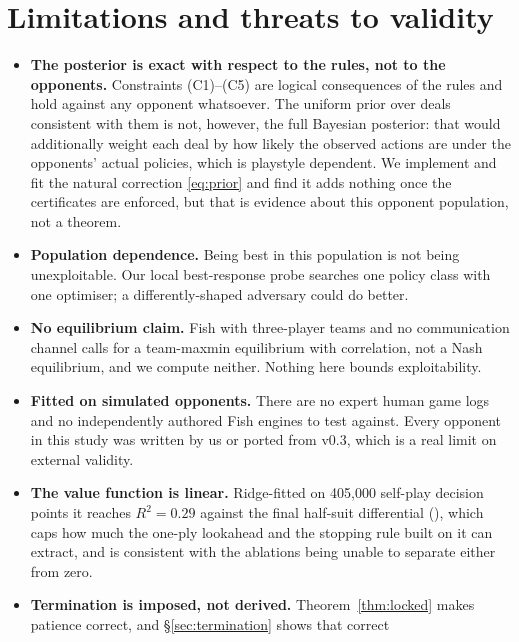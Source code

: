 \section{Limitations and threats to validity}
\label{sec:limitations}

\begin{itemize}
  \item \textbf{The posterior is exact with respect to the rules, not to the
        opponents.} Constraints (C1)--(C5) are logical consequences of the
        rules and hold against any opponent whatsoever. The uniform prior over
        deals consistent with them is not, however, the full Bayesian posterior:
        that would additionally weight each deal by how likely the observed
        actions are under the opponents' actual policies, which is playstyle
        dependent. We implement and fit the natural correction \eqref{eq:prior}
        and find it adds nothing once the certificates are enforced, but that is
        evidence about this opponent population, not a theorem.
  \item \textbf{Population dependence.} Being best in this population is not
        being unexploitable. Our local best-response probe searches one policy
        class with one optimiser; a differently-shaped adversary could do better.
  \item \textbf{No equilibrium claim.} Fish with three-player teams and no
        communication channel calls for a team-maxmin equilibrium with
        correlation, not a Nash equilibrium, and we compute neither. Nothing here
        bounds exploitability.
  \item \textbf{Fitted on simulated opponents.} There are no expert human game
        logs and no independently authored Fish engines to test against. Every
        opponent in this study was written by us or ported from v0.3, which is a
        real limit on external validity.
  \item \textbf{The value function is linear.} Ridge-fitted on 405{,}000
        self-play decision points it reaches $R^2 = 0.29$ against the final
        half-suit differential
        (), which caps how much
        the one-ply lookahead and the stopping rule built on it can extract, and
        is consistent with the ablations being unable to separate either from
        zero.
  \item \textbf{Termination is imposed, not derived.} Theorem~\ref{thm:locked}
        makes patience correct, and \S\ref{sec:termination} shows that correct

\end{itemize}
